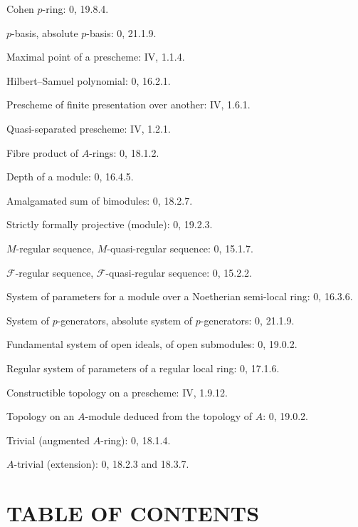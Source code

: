 Cohen $p$-ring: 0, 19.8.4.\par
$p$-basis, absolute $p$-basis: 0, 21.1.9.\par
Maximal point of a prescheme: IV, 1.1.4.\par

\clearpage
{}
Hilbert--Samuel polynomial: 0, 16.2.1.\par
Prescheme of finite presentation over another: IV, 1.6.1.\par
Quasi-separated prescheme: IV, 1.2.1.\par
Fibre product of $A$-rings: 0, 18.1.2.\par
Depth of a module: 0, 16.4.5.\par

Amalgamated sum of bimodules: 0, 18.2.7.\par
Strictly formally projective (module): 0, 19.2.3.\par
$M$-regular sequence, $M$-quasi-regular sequence: 0, 15.1.7.\par
$\mathscr F$-regular sequence, $\mathscr F$-quasi-regular sequence: 0, 15.2.2.\par
System of parameters for a module over a Noetherian semi-local ring: 0, 16.3.6.\par
System of $p$-generators, absolute system of $p$-generators: 0, 21.1.9.\par
Fundamental system of open ideals, of open submodules: 0, 19.0.2.\par
Regular system of parameters of a regular local ring: 0, 17.1.6.\par

Constructible topology on a prescheme: IV, 1.9.12.\par
Topology on an $A$-module deduced from the topology of $A$: 0, 19.0.2.\par
Trivial (augmented $A$-ring): 0, 18.1.4.\par
$A$-trivial (extension): 0, 18.2.3 and 18.3.7.\par

\clearpage
{}
{}

\section*{TABLE OF CONTENTS}

